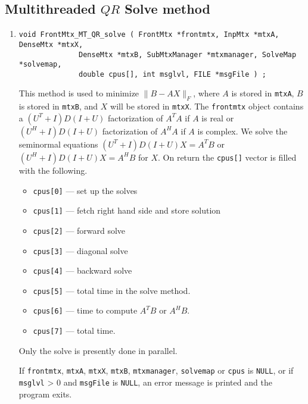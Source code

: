 \subsection{Multithreaded $QR$ Solve method}
\label{subsection:FrontMtx:proto:QRsolve-MT}
\par
\begin{enumerate}
\item
\begin{verbatim}
void FrontMtx_MT_QR_solve ( FrontMtx *frontmtx, InpMtx *mtxA, DenseMtx *mtxX,
              DenseMtx *mtxB, SubMtxManager *mtxmanager, SolveMap *solvemap,
              double cpus[], int msglvl, FILE *msgFile ) ;
\end{verbatim}
This method is used to minimize $\|B - AX\|_F$, where
$A$ is stored in {\tt mtxA},
$B$ is stored in {\tt mtxB},
and $X$ will be stored in {\tt mtxX}.
The {\tt frontmtx} object contains a
$(U^T+I)D(I+U)$ factorization of $A^TA$ if $A$ is real
or
$(U^H+I)D(I+U)$ factorization of $A^HA$ if $A$ is complex.
We solve the seminormal equations
$(U^T+I)D(I+U)X = A^TB$ or $(U^H+I)D(I+U)X = A^HB$
for $X$.
On return the {\tt cpus[]} vector is filled with the following.
\begin{itemize}
\item
{\tt cpus[0]} --- set up the solves
\item
{\tt cpus[1]} --- fetch right hand side and store solution
\item
{\tt cpus[2]} --- forward solve
\item
{\tt cpus[3]} --- diagonal solve
\item
{\tt cpus[4]} --- backward solve
\item
{\tt cpus[5]} --- total time in the solve method.
\item
{\tt cpus[6]} --- time to compute $A^TB$ or $A^HB$.
\item
{\tt cpus[7]} --- total time.
\end{itemize}
Only the solve is presently done in parallel.
\par {}
If {\tt frontmtx}, {\tt mtxA}, {\tt mtxX}, {\tt mtxB}, {\tt mtxmanager},
{\tt solvemap} or {\tt cpus} is {\tt NULL},
or if {\tt msglvl} > 0 and {\tt msgFile} is {\tt NULL},
an error message is printed and the program exits.
\end{enumerate}


